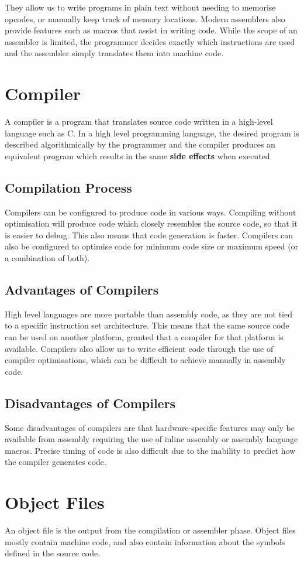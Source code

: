 \documentclass{report}
\begin{document}
They allow us to write programs in plain text without needing to memorise opcodes,
or manually keep track of memory locations. Modern assemblers also provide features
such as macros that assist in writing code. While the scope of an assembler is
limited, the programmer decides exactly which instructions are used and the
assembler simply translates them into machine code.
\section{Compiler}
A compiler is a program that translates source code written in a high-level language
such as C. In a high level programming language, the desired program is described
algorithmically by the programmer and the compiler produces an equivalent program
which results in the same \textbf{side effects} when executed.
\subsection{Compilation Process}
Compilers can be configured to produce code in various ways. Compiling without
optimisation will produce code which closely resembles the source code, so that it is easier to debug.
This also means that code generation is faster. Compilers can also be configured to
optimise code for minimum code size or maximum speed (or a combination of both).
\subsection{Advantages of Compilers}
High level languages are more portable than assembly code, as they are not tied to a specific instruction set
architecture. This means that the same source code can be used on another platform, granted
that a compiler for that platform is available. Compilers also allow us to write efficient code
through the use of compiler optimisations, which can be difficult to achieve manually in assembly code.
\subsection{Disadvantages of Compilers}
Some disadvantages of compilers are that hardware-specific features may only be available from assembly
requiring the use of inline assembly or assembly language macros. Precise timing of code is also difficult
due to the inability to predict how the compiler generates code.
\section{Object Files}
An object file is the output from the compilation or assembler phase.
Object files mostly contain machine code, and also contain information about
the symbols defined in the source code.
\end{document}
